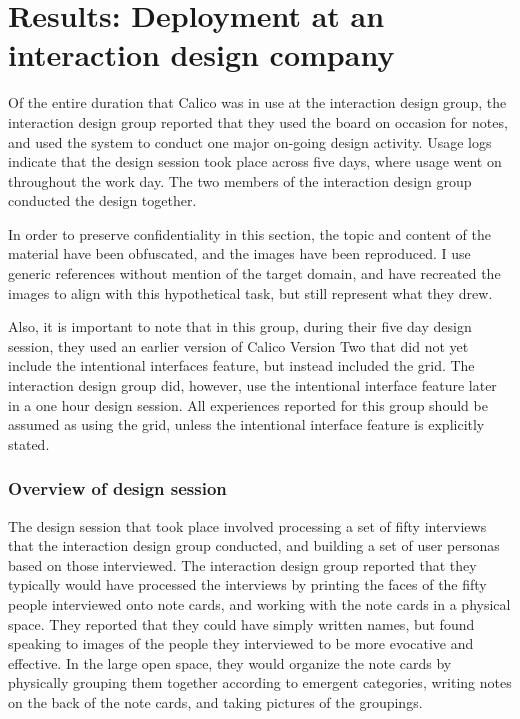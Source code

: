 \section{Results: Deployment at an interaction design company}
\label{chapter:evaluation:deployment2}

Of the entire duration that Calico was in use at the interaction design group, the interaction design group reported that they used the board on occasion for notes, and used the system to conduct one major on-going design activity. Usage logs indicate that the design session took place across five days, where usage went on throughout the work day. The two members of the interaction design group conducted the design together.

In order to preserve confidentiality in this section, the topic and content of the material have been obfuscated, and the images have been reproduced. I use generic references without mention of the target domain, and have recreated the images to align with this hypothetical task, but still represent what they drew.

Also, it is important to note that in this group, during their five day design session, they used an earlier version of Calico Version Two that did not yet include the intentional interfaces feature, but instead included the grid. The interaction design group did, however, use the intentional interface feature later in a one hour design session. All experiences reported for this group should be assumed as using the grid, unless the intentional interface feature is explicitly stated.

\subsubsection{Overview of design session}

The design session that took place involved processing a set of fifty interviews that the interaction design group conducted, and building a set of user personas based on those interviewed. The interaction design group reported that they typically would have processed the interviews by printing the faces of the fifty people interviewed onto note cards, and working with the note cards in a physical space. They reported that they could have simply written names, but found speaking to images of the people they interviewed to be more evocative and effective. In the large open space, they would organize the note cards by physically grouping them together according to emergent categories, writing notes on the back of the note cards, and taking pictures of the groupings. 

